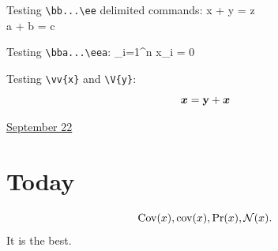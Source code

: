 \documentclass[letterpaper,11pt]{article}
\begin{document}
Testing \verb|\bb...\ee| delimited commands:
\bb
x + y = z \\
a + b = c
\ee

Testing \verb|\bba...\eea|:
\bba
\label{eq:test}
\sum_{i=1}^n x_i = 0
\eea

Testing \verb|\vv{x}| and \verb|\V{y}|:
$$\boldsymbol{x} = \mathbf{y} + \boldsymbol{x}$$
\clearpage


\href{run:2025-09-22.tex}{\Huge September 22} 

\section{Today}
$$
\mathrm{Cov}(x), \mathrm{cov}(x), \mathrm{Pr}(x), \mathcal{N}(x). 
$$
It is the best. 


\clearpage




\end{document}
